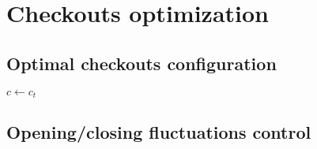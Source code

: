 \section{Checkouts optimization}
\label{sec:checkouts_optimization}

\subsection{Optimal checkouts configuration}
\label{subsec:optimal_checkouts_configuration}

\begin{algorithm}[H]
  $ c \gets c_t$\;
\end{algorithm}


\subsection{Opening/closing fluctuations control}
\label{subsec:opening_closing_fluctuations_control}

\clearpage